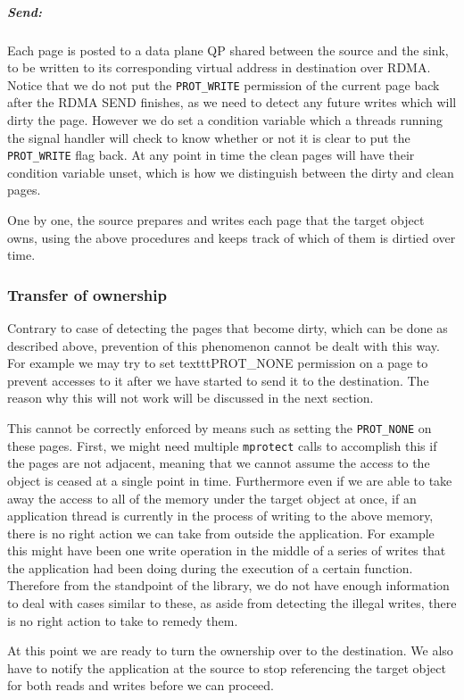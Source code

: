 \subparagraph{Send:} Each page is posted to a data plane QP shared between the
source and the sink, to be written to its corresponding virtual address in
destination over RDMA. Notice that we do not put the \texttt{PROT\_WRITE} permission
of the current page back after the RDMA SEND finishes, as we need to
detect any future writes which will dirty the page.
However we do set a condition variable which a threads running the signal
handler will check to know whether or not it is clear to put the \texttt{PROT\_WRITE} flag back.
At any point in time the clean pages will have their condition variable unset,
which is how we distinguish between the dirty and clean pages.

One by one, the source prepares and writes each page that the target object
owns, using the above procedures and keeps track of which of them is dirtied
over time.

\subsubsection{Transfer of ownership}

Contrary to case of detecting the pages that become dirty, which can be done
as described above, prevention of this phenomenon cannot be dealt with this way.
For example we may try to set texttt{PROT\_NONE} permission on a page to
prevent accesses to it after we have started to send it to the destination.
The reason why this will not work will be discussed in the next section.


This cannot be correctly enforced by means such as setting the
\texttt{PROT\_NONE} on these pages. First, we might need multiple
\texttt{mprotect} calls to accomplish this if the pages are not adjacent,
meaning that we cannot assume the access to the object is ceased at a single
point in time. Furthermore even if we are able to take away the access to all
of the memory under the target object at once, if an application thread is
currently in the process of writing to the above memory, there is no right
action we can take from outside the application. For example this might have
been one write operation in the middle of a series of writes that the
application had been doing during the execution of a certain function. Therefore
from the standpoint of the library, we do not have enough information to deal
with cases similar to these, as aside from detecting the illegal writes, there
is no right action to take to remedy them.

\label{sec:transferownership}
At this point we are ready to turn the ownership over to the destination.
We also have to notify the application at the source to stop referencing the
target object for both reads and writes before we can proceed.

